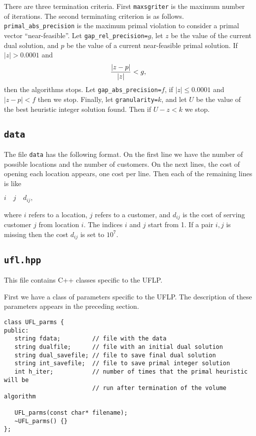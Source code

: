 \documentclass{article}
\begin{document}
There are three termination criteria. First {\tt maxsgriter} is the maximum
number of iterations. The second terminating criterion is as follows. {\tt
primal\_abs\_precision} is the maximum primal violation to consider a primal
vector ``near-feasible''. Let {\tt gap\_rel\_precision=$g$}, let $z$ be the
value of the current dual solution, and $p$ be the value of a current
near-feasible primal solution. If $|z| > 0.0001$ and
$$
        { | z - p | \over | z | } < g,
$$
then the algorithms stops. Let {\tt gap\_abs\_precision=$f$}, if $|z| \le
0.0001$ and $| z - p | < f$ then we stop. Finally, let {\tt granularity=$k$},
and let $U$ be the value of the best heuristic integer solution found. Then if
$ U - z < k$ we stop.

\subsection{{\tt data}}

The file {\tt data} has the following format. On the first line we have the
number of possible locations and the number of customers. On the next lines,
the cost of opening each location appears, one cost per line. Then each of the
remaining lines is like

$
i \quad j \quad d_{ij},
$

\noindent where $i$ refers to a location, $j$ refers to a customer, and
$d_{ij}$ is the cost of serving customer $j$ from location $i$. The indices
$i$ and $j$ start from 1. If a pair $i,j$ is missing then the cost $d_{ij}$ is
set to $10^7$.


\subsection{{\tt ufl.hpp}}

This file contains C++ classes specific to the UFLP.

First we have a class of parameters specific to the UFLP. The description
of these parameters appears in the preceding section.

\begin{verbatim}
class UFL_parms {
public:
   string fdata;         // file with the data
   string dualfile;      // file with an initial dual solution
   string dual_savefile; // file to save final dual solution
   string int_savefile;  // file to save primal integer solution
   int h_iter;           // number of times that the primal heuristic will be
                         // run after termination of the volume algorithm
   
   UFL_parms(const char* filename);
   ~UFL_parms() {}
};
\end{verbatim}
\end{document}
